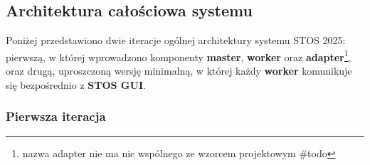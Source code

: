 \documentclass[12pt,a4paper]{article}
\begin{document}
\newpage
\subsection{Architektura całościowa systemu}

Poniżej przedstawiono dwie iteracje ogólnej architektury systemu STOS 2025: pierwszą, w której wprowadzono komponenty \textbf{master}, \textbf{worker} oraz \textbf{adapter}\footnote{nazwa adapter nie ma nic wspólnego ze wzorcem projektowym \#todo}, oraz drugą, uproszczoną wersję minimalną, w której każdy \textbf{worker} komunikuje się bezpośrednio z \textbf{STOS GUI}.


\subsubsection{Pierwsza iteracja}
\end{document}
